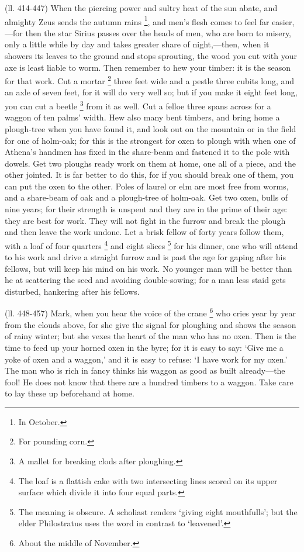 (ll. 414-447) When the piercing power and sultry heat of the sun abate, and
almighty Zeus sends the autumn rains \footnote{In October.}, and
men’s flesh comes to feel far easier,—for then the star Sirius
passes over the heads of men, who are born to misery, only a little while by
day and takes greater share of night,—then, when it showers its leaves to
the ground and stops sprouting, the wood you cut with your axe is least liable
to worm. Then remember to hew your timber: it is the season for that work. Cut
a mortar \footnote{For pounding corn.} three feet wide and a pestle
three cubits long, and an axle of seven feet, for it will do very well so; but
if you make it eight feet long, you can cut a beetle \footnote{A mallet for breaking
clods after ploughing.} from it
as well. Cut a felloe three spans across for a waggon of ten palms’
width. Hew also many bent timbers, and bring home a plough-tree when you have
found it, and look out on the mountain or in the field for one of holm-oak; for
this is the strongest for oxen to plough with when one of Athena’s
handmen has fixed in the share-beam and fastened it to the pole with dowels.
Get two ploughs ready work on them at home, one all of a piece, and the other
jointed. It is far better to do this, for if you should break one of them, you
can put the oxen to the other. Poles of laurel or elm are most free from worms,
and a share-beam of oak and a plough-tree of holm-oak. Get two oxen, bulls of
nine years; for their strength is unspent and they are in the prime of their
age: they are best for work. They will not fight in the furrow and break the
plough and then leave the work undone. Let a brisk fellow of forty years follow
them, with a loaf of four quarters \footnote{The loaf is a flattish
cake with two intersecting lines scored on its upper surface which divide it
into four equal parts.} and eight
slices \footnote{The meaning is obscure. A
scholiast renders ‘giving eight mouthfulls’; but the elder
Philostratus uses the word in contrast to ‘leavened’.} for his dinner, one who will
attend to his work and drive a straight furrow and is past the age for gaping
after his fellows, but will keep his mind on his work. No younger man will be
better than he at scattering the seed and avoiding double-sowing; for a man
less staid gets disturbed, hankering after his fellows.

(ll. 448-457) Mark, when you hear the voice of the crane \footnote{About the middle of
November.} who cries year by year from the
clouds above, for she give the signal for ploughing and shows the season of
rainy winter; but she vexes the heart of the man who has no oxen. Then is the
time to feed up your horned oxen in the byre; for it is easy to say:
‘Give me a yoke of oxen and a waggon,’ and it is easy to refuse:
‘I have work for my oxen.’ The man who is rich in fancy thinks his
waggon as good as built already—the fool! He does not know that there are
a hundred timbers to a waggon. Take care to lay these up beforehand at home.

